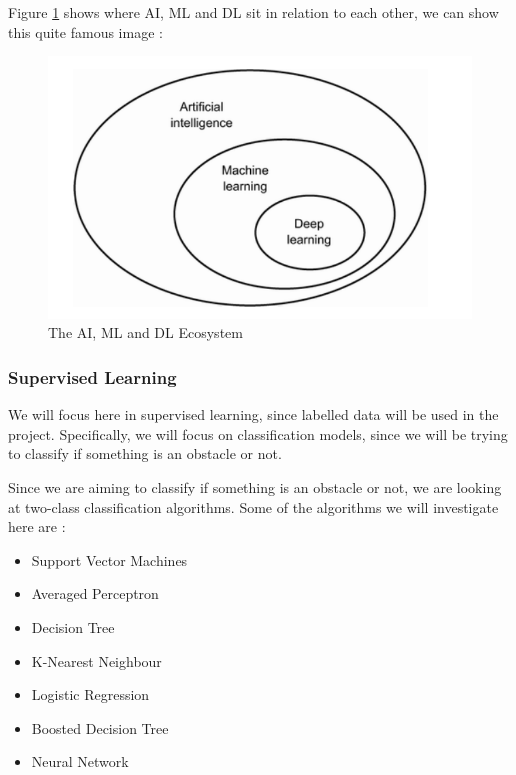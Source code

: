 \documentclass[conference]{IEEEtran}
\begin{document}
Figure \ref{fig:ai-ml-dl} \cite{pythonDL} shows where AI, ML and DL sit in relation to each other, we can show this quite famous image :

\begin{figure}
    \centering
    \includegraphics[scale=0.3]{ai-ml-dl.png}
    \caption{The AI, ML and DL Ecosystem}
    \label{fig:ai-ml-dl}
\end{figure}


\subsubsection{Supervised Learning}
We will focus here in supervised learning, since labelled data will be used in the project. Specifically, we will focus on classification models, since we will be trying to classify if something is an obstacle or not.

Since we are aiming to classify if something is an obstacle or not, we are looking at two-class classification algorithms. Some of the algorithms we will investigate here are \cite{azure}:


\begin{itemize}
    \item Support Vector Machines
    \item Averaged Perceptron
    \item Decision Tree
    \item K-Nearest Neighbour
    \item Logistic Regression
    \item Boosted Decision Tree
    \item Neural Network
\end{itemize}




\printbibliography
\vspace{12pt}
\end{document}
